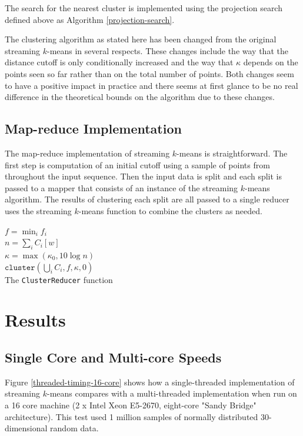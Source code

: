 \documentclass[11pt]{amsart}
\begin{document}
The search for the nearest cluster is implemented using the projection search defined above as Algorithm \ref{projection-search}.

The clustering algorithm as stated here has been changed from the original streaming $k$-means in several respects.  These changes include the way that the distance cutoff is only conditionally increased and the way that $\kappa$ depends on the points seen so far rather than on the total number of points.  Both changes seem to have a positive impact in practice and there seems at first glance to be no real difference in the theoretical bounds on the algorithm due to these changes.
\subsection{Map-reduce Implementation}

The map-reduce implementation of streaming $k$-means is straightforward.  The first step is computation of an initial cutoff using a sample of points from throughout the input sequence.  Then the input data is split and each split is passed to a mapper that consists of an instance of the streaming $k$-means algorithm.  The results of clustering each split are all passed to a single reducer uses the streaming $k$-means function to combine the clusters as needed.

\begin{algorithm}[H]
\SetNoFillComment
{}
$f = \min_i f_i$ \\
$n = \sum_i C_i[w]$\\
$\kappa = \max\left(\kappa_0, 10 \log n \right)$\\
\Return $ \mathtt {cluster}( \bigcup_i C_i, f, \kappa, 0)$\\
\caption{The {\tt ClusterReducer} function}
\end{algorithm}
\section{Results}

\subsection{Single Core and Multi-core Speeds}

Figure \ref{threaded-timing-16-core} shows how a single-threaded implementation of streaming $k$-means compares with a multi-threaded implementation when run on a 16 core machine (2 x Intel Xeon E5-2670, eight-core "Sandy Bridge" architecture).  This test used 1 million samples of normally distributed 30-dimensional random data.  
\end{document}
